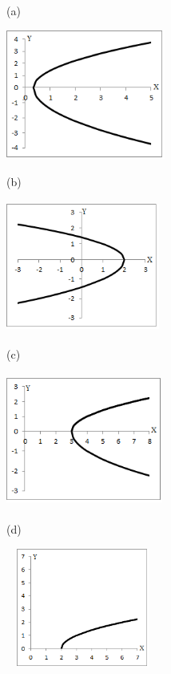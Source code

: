 \begin{enumerate}[label=\thechapter.\arabic*]
\begin{multicols}{2}
\begin{figure}[H]
        (a)
\end{figure}

\begin{figure}[H]
        \includegraphics[width=2.06in,height=1.68in]{capitulos/funcao_do_segundo_grau/media/image43.png}
        
        (b)
\end{figure}

\begin{figure}[H]
        \includegraphics[width=1.99in,height=1.69in]{capitulos/funcao_do_segundo_grau/media/image44.png}
        
        (c)
\end{figure}

\begin{figure}[H]
        \includegraphics[width=2.03in,height=1.73in]{capitulos/funcao_do_segundo_grau/media/image45.png}
        
        (d)
\end{figure}

\begin{figure}[H]
        \includegraphics[width=1.99in,height=1.54in]{capitulos/funcao_do_segundo_grau/media/image46.png}
        

\end{figure}
\end{multicols}
\end{enumerate}
